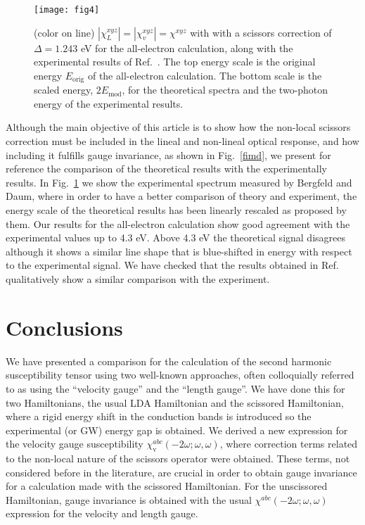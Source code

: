 \documentclass[floatfix,prb,aps,superscriptaddress,11pt]{revtex4}
\begin{document}
\begin{figure}[t]
\texttt{[image: fig4]}
\caption{(color on line)
$|\chi^{xyz}_{L}|=|\chi^{xyz}_{v}|=\chi^{xyz}$ with with a scissors correction of
$\Delta=1.243$ eV
for the
all-electron calculation,
along with the
experimental results of
Ref.~.
The top energy scale is the original energy $E_{\mathrm{orig}}$
of the all-electron calculation.
The bottom scale is the scaled energy, $2E_{\mathrm{mod}}$,\cite{nota3} for the theoretical
spectra and the two-photon energy of the experimental results.
}
\label{exp}
\end{figure}

Although the main objective of this article is to show how the
non-local scissors correction must be included in the lineal
and non-lineal optical response, and how including it fulfills
gauge invariance, as shown in Fig.~\ref{fimd}, we present for reference
the comparison of the theoretical results with the experimentally
results.   
In Fig.~\ref{exp} we  show the experimental spectrum measured by
Bergfeld and Daum,\cite{bergfeldPRL03} where in order to have a better
comparison of theory and experiment, the energy scale
of the theoretical results has been linearly rescaled as proposed 
by them.\cite{nota3}
Our results for the all-electron calculation
show  good agreement with the experimental values up to 4.3 eV.
Above 4.3 eV
the theoretical signal disagrees although it shows a similar line
shape that is blue-shifted in energy with respect to the experimental signal.
We have checked that the results obtained in 
Ref.~
qualitatively show a similar comparison with the experiment.




\section{Conclusions}

\label{conclusions}

We have presented a comparison for the calculation of the second harmonic
susceptibility tensor using two well-known approaches, often colloquially
referred to as using the ``velocity gauge'' and the ``length gauge''. We have
done this for two Hamiltonians, the usual LDA Hamiltonian and the scissored
Hamiltonian, where a rigid energy shift in the conduction bands is
introduced so the experimental (or GW) energy gap is obtained. We derived a
new expression for the velocity gauge susceptibility 
$\chi _{\mathrm{v}}^{abc}(-2\omega;\omega,\omega)$, where correction terms related to the non-local
nature of the scissors operator were obtained. These terms, not considered
before in the literature, are crucial in order to obtain gauge invariance
for a calculation made with the scissored Hamiltonian. For the unscissored
Hamiltonian, gauge invariance is obtained with the usual 
$\chi^{abc}(-2\omega;\omega,\omega)$ expression for the velocity and length gauge.
\end{document}
